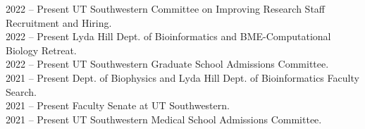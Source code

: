 2022 -- Present \hspace{14pt} UT Southwestern Committee on Improving Research Staff Recruitment and Hiring. \\
2022 -- Present \hspace{14pt} Lyda Hill Dept. of Bioinformatics and BME-Computational Biology Retreat. \\
2022 -- Present \hspace{14pt} UT Southwestern Graduate School Admissions Committee. \\
2021 -- Present \hspace{14pt} Dept. of Biophysics and Lyda Hill Dept. of Bioinformatics Faculty Search. \\
2021 -- Present \hspace{14pt}  Faculty Senate at UT Southwestern.  \\
2021 -- Present \hspace{14pt}  UT Southwestern Medical School Admissions Committee.